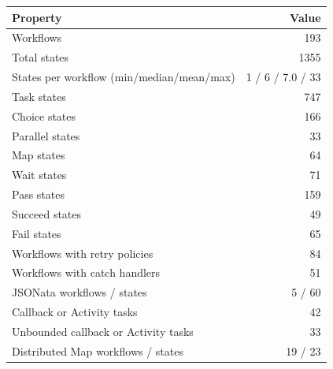 \begin{tabular}{lr}
\toprule
Property & Value \\
\midrule
Workflows & 193 \\
Total states & 1355 \\
States per workflow (min/median/mean/max) & 1 / 6 / 7.0 / 33 \\
Task states & 747 \\
Choice states & 166 \\
Parallel states & 33 \\
Map states & 64 \\
Wait states & 71 \\
Pass states & 159 \\
Succeed states & 49 \\
Fail states & 65 \\
Workflows with retry policies & 84 \\
Workflows with catch handlers & 51 \\
JSONata workflows / states & 5 / 60 \\
Callback or Activity tasks & 42 \\
Unbounded callback or Activity tasks & 33 \\
Distributed Map workflows / states & 19 / 23 \\
\bottomrule
\end{tabular}
